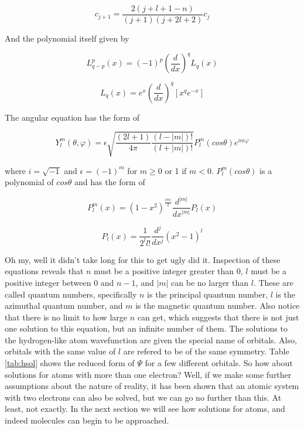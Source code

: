 \begin{equation}
\label{eq:wavehydro_R_coef}
c_{j+1} = \frac{2(j+l+1-n)}{(j+1)(j+2l+2)}c_{j}
\end{equation} 

And the polynomial itself given by

\begin{equation}
\label{eq:wavehydro_L1}
L^{p}_{q-p}(x) = (-1)^{p}\left(\frac{d}{dx}\right)^{q}L_{q}(x)
\end{equation}

\begin{equation}
\label{eq:wavehydro_L2}
L_{q}(x) = e^{x}\left(\frac{d}{dx}\right)^{q}\left[x^{q}e^{-x}\right]
\end{equation}

The angular equation has the form of 

\begin{equation}
\label{eq:wavehydro_Y1}
Y^{m}_{l}(\theta,\varphi) = \epsilon\sqrt{\frac{(2l + 1)}{4\pi}\frac{(l-|m|)!}{(l+|m|)!}}P^{m}_{l}(cos\theta)e^{im\varphi}
\end{equation}

where $i=\sqrt{-1}$ and $\epsilon = (-1)^{m}$ for $m \geq 0$ or 1 if  $m < 0$. $P^{m}_{l}(cos\theta)$ is a polynomial of $cos\theta$ and has the form of

\begin{equation}
\label{eq:wavehydro_Y2}
P^{m}_{l}(x) = (1 - x^{2})^{\frac{|m|}{2}}\frac{d^{|m|}}{dx^{|m|}}P_{l}(x)
\end{equation}

\begin{equation}
\label{eq:wavehydro_Y3}
P_{l}(x) = \frac{1}{2^{l}l!}\frac{d^{j}}{dx^{j}}(x^{2}-1)^{l}
\end{equation} 

Oh my, well it didn't take long for this to get ugly did it. Inspection of these equations reveals that $n$ must be a positive integer greater than 0, $l$ must be a positive integer between 0 and $n-1$, and $|m|$ can be no larger than $l$. These are called quantum numbers, specifically $n$ is the principal quantum number, $l$ is the azimuthal quantum number, and $m$ is the magnetic quantum number. Also notice that there is no limit to how large $n$ can get, which suggests that there is not just one solution to this equation, but an infinite number of them. The solutions to the hydrogen-like atom wavefunction are given the special name of orbitals. Also, orbitals with the same value of $l$ are refered to be of the same symmetry. Table \ref{tab:hsol} shows the reduced form of $\Psi$ for a few different orbitals. So how about solutions for atoms with more than one electron? Well, if we make some further assumptions about the nature of reality, it has been shown that an atomic system with two electrons can also be solved\cite{harmonium}, but we can go no further than this. At least, not exactly. In the next section we will see how solutions for atoms, and indeed molecules can begin to be approached.

